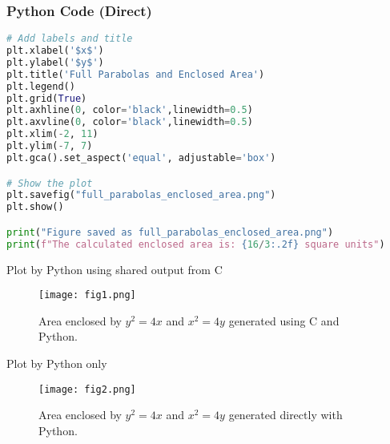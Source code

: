 \documentclass{beamer}
\begin{document}
\begin{frame}[fragile]
\frametitle{Python Code (Direct)}
\begin{lstlisting}[language=Python]
# Add labels and title
plt.xlabel('$x$')
plt.ylabel('$y$')
plt.title('Full Parabolas and Enclosed Area')
plt.legend()
plt.grid(True)
plt.axhline(0, color='black',linewidth=0.5)
plt.axvline(0, color='black',linewidth=0.5)
plt.xlim(-2, 11) 
plt.ylim(-7, 7)  
plt.gca().set_aspect('equal', adjustable='box')

# Show the plot
plt.savefig("full_parabolas_enclosed_area.png")
plt.show()

print("Figure saved as full_parabolas_enclosed_area.png")
print(f"The calculated enclosed area is: {16/3:.2f} square units")
\end{lstlisting}
\end{frame}

\begin{frame}{Plot by Python using shared output from C}
\begin{figure}[H]
\centering
\texttt{[image: fig1.png]}
\caption{Area enclosed by $y^2=4x$ and $x^2=4y$ generated using C and Python.}
\label{fig:1}
\end{figure}
\end{frame}

\begin{frame}{Plot by Python only}
\begin{figure}[H]
\centering
\texttt{[image: fig2.png]}
\caption{Area enclosed by $y^2=4x$ and $x^2=4y$ generated directly with Python.}
\label{fig:2}
\end{figure}
\end{frame}
\end{document}
